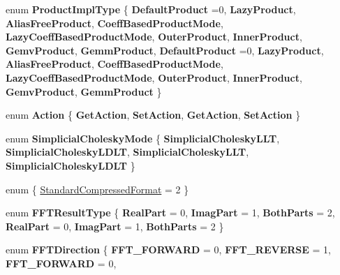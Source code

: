 \begin{DoxyCompactItemize}
enum {\bfseries Product\+Impl\+Type} \{ \newline
{\bfseries Default\+Product} =0, 
{\bfseries Lazy\+Product}, 
{\bfseries Alias\+Free\+Product}, 
{\bfseries Coeff\+Based\+Product\+Mode}, 
\newline
{\bfseries Lazy\+Coeff\+Based\+Product\+Mode}, 
{\bfseries Outer\+Product}, 
{\bfseries Inner\+Product}, 
{\bfseries Gemv\+Product}, 
\newline
{\bfseries Gemm\+Product}, 
{\bfseries Default\+Product} =0, 
{\bfseries Lazy\+Product}, 
{\bfseries Alias\+Free\+Product}, 
\newline
{\bfseries Coeff\+Based\+Product\+Mode}, 
{\bfseries Lazy\+Coeff\+Based\+Product\+Mode}, 
{\bfseries Outer\+Product}, 
{\bfseries Inner\+Product}, 
\newline
{\bfseries Gemv\+Product}, 
{\bfseries Gemm\+Product}
 \}
\item 
\mbox{\label{namespace_eigen_a3cbc3ee52075935e7854d9f65c5a8e03}} 
enum {\bfseries Action} \{ {\bfseries Get\+Action}, 
{\bfseries Set\+Action}, 
{\bfseries Get\+Action}, 
{\bfseries Set\+Action}
 \}
\item 
\mbox{\label{namespace_eigen_a9763111c1564d759c6b8abbf3c9f231b}} 
enum {\bfseries Simplicial\+Cholesky\+Mode} \{ {\bfseries Simplicial\+Cholesky\+L\+LT}, 
{\bfseries Simplicial\+Cholesky\+L\+D\+LT}, 
{\bfseries Simplicial\+Cholesky\+L\+LT}, 
{\bfseries Simplicial\+Cholesky\+L\+D\+LT}
 \}
\item 
enum \{ \hyperlink{namespace_eigen_a668ffb0fb66c55c1c98bd35c52df648eaf81fc519ed9cc0ebc6aac69a366086a5}{Standard\+Compressed\+Format} = 2
 \}
\item 
\mbox{\label{namespace_eigen_a5c51628ff1971f45d37282fedc8cdafe}} 
enum {\bfseries F\+F\+T\+Result\+Type} \{ \newline
{\bfseries Real\+Part} = 0, 
{\bfseries Imag\+Part} = 1, 
{\bfseries Both\+Parts} = 2, 
{\bfseries Real\+Part} = 0, 
\newline
{\bfseries Imag\+Part} = 1, 
{\bfseries Both\+Parts} = 2
 \}
\item 
\mbox{\label{namespace_eigen_a21243f618445aca2fd04fd6a0f0f6bf6}} 
enum {\bfseries F\+F\+T\+Direction} \{ {\bfseries F\+F\+T\+\_\+\+F\+O\+R\+W\+A\+RD} = 0, 
{\bfseries F\+F\+T\+\_\+\+R\+E\+V\+E\+R\+SE} = 1, 
{\bfseries F\+F\+T\+\_\+\+F\+O\+R\+W\+A\+RD} = 0, 

\end{DoxyCompactItemize}
